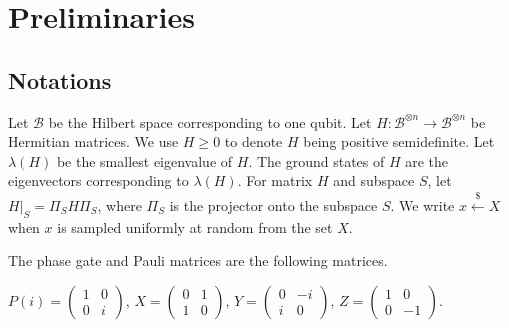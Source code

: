 \section{Preliminaries} \label{sec:prelim}

\subsection{Notations}

Let $\mathcal{B}$ be the Hilbert space corresponding to one qubit. Let $H:\mathcal{B}^{\otimes n}\rightarrow\mathcal{B}^{\otimes n}$ be Hermitian matrices. We use $H\geq0$ to denote $H$ being positive semidefinite. Let $\lambda(H)$ be the smallest eigenvalue of $H$. The ground states of $H$ are the eigenvectors corresponding to $\lambda(H)$. For matrix $H$ and subspace $S$, let $H\big|_S=\Pi_S H \Pi_S$, where $\Pi_S$ is the projector onto the subspace $S$.  
We write $x\xleftarrow{\$}X$ when $x$ is sampled uniformly at random from the set $X$.

The phase gate and Pauli matrices are the following matrices.

\begin{definition}
    $P(i)=\begin{pmatrix}1&0\\0&i\end{pmatrix}$,
    $X=\begin{pmatrix}0&1\\1&0\end{pmatrix}$,
    $Y=\begin{pmatrix}0&-i\\i&0\end{pmatrix}$,
    $Z=\begin{pmatrix}1&0\\0&-1\end{pmatrix}$.
\end{definition}

